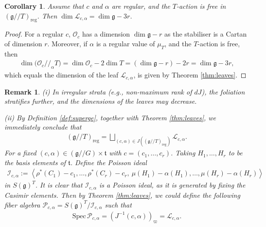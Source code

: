 \documentclass[11pt,reqno]{amsart}
\newtheorem*{theorem A}{Main Theorem A}
\newtheorem*{theorem B}{Main Theorem B}
\newtheorem*{theorem C}{Main Theorem C}
\newtheorem*{theorem D}{Main Theorem D}
\theoremstyle{definition}
\theoremstyle{plain}
\newtheorem{corollary}[theorem]{Corollary}
\newtheorem{remark}[theorem]{Remark}
\theoremstyle{conclusion}
\begin{document}
\begin{corollary}
\label{cor:dimension}
Assume that $c$ and $\alpha$ are regular, and the $T$-action is free in $(\mathfrak{g}//T)_{\mathrm{reg}}$. Then $  \dim \mathcal{L}_{c,\alpha} = \dim\mathfrak{g} - 3r$. 
\end{corollary}
\begin{proof}
For a regular $c$, $\mathcal{O}_c$ has a dimension $\dim\mathfrak{g} - r$ as the stabiliser is a Cartan of dimension $r$. Moreover, if $\alpha$ is a regular value of $\mu_T$, and the $T$-action is free, then \begin{align*}
 \dim\bigl(\mathcal{O}_c//_{\alpha} T\bigr)=\dim\mathcal{O}_c - 2\dim T = (\dim\mathfrak{g} - r) - 2r = \dim\mathfrak{g} - 3r,
\end{align*}  which equals the dimension of the leaf $\mathcal{L}_{c,\alpha}$, is given by Theorem \ref{thm:leaves}.
\end{proof}
\begin{remark}
(i) In irregular strata (e.g., non-maximum rank of $dJ$), the foliation stratifies further, and the dimensions of the leaves may decrease.

(ii) %
By Definition \ref{def:superge}, together with Theorem \ref{thm:leaves}, we immediately conclude that \begin{align*}
    \left(\mathfrak{g}//T\right)_{\mathrm{reg}} = \bigsqcup_{(c,\alpha) \in J\left(\left(\mathfrak{g}//T\right)_{\mathrm{reg}} \right)} \mathcal{L}_{c,\alpha}.
\end{align*} For a fixed $(c,\alpha) \in \left(\mathfrak{g}//G\right) \times \mathfrak{t} $ with $c = (c_1,\ldots,c_r)$. Taking $H_1,\ldots,H_r$ to be the basis elements of $\mathfrak{t}$. Define the Poisson ideal \begin{align}
    \mathcal{I}_{c,\alpha} := \left\langle \rho^*(C_1) - c_1,\ldots,\rho^*(C_r) -c_r, \ \mu(H_1) -\alpha(H_1),\ldots, \mu(H_r) -\alpha(H_r)\right\rangle \label{eq:ideal}
\end{align} in $S(\mathfrak{g})^T$. It is clear that  $\mathcal{I}_{c,\alpha}$ is a Poisson ideal, as it is generated by fixing the Casimir elements. Then by Theorem \ref{thm:leaves}, we could define the following fiber algebra $\mathcal{P}_{c,\alpha} =  S(\mathfrak{g})^T \big/\mathcal{I}_{c,\alpha} $ such that \begin{align*}
    \mathrm{Spec} \, \mathcal{P}_{c,\alpha} =  \left(J^{-1}(c,\alpha)\right)_{\varpi} = \mathcal{L}_{c,\alpha} .
\end{align*}
\end{remark}
\end{document}
